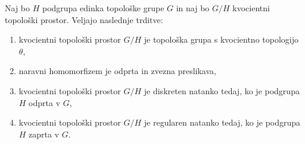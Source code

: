 \documentclass[mat1]{fmfdelo}
\begin{document}
\begin{izrek}\label{izr:kvocpovzetek}
Naj bo $H$ podgrupa edinka topološke grupe $G$ in naj bo $G/H$ kvocientni topološki prostor. Veljajo naslednje trditve:
\begin{enumerate}
\item kvocientni topološki prostor $G/H$ je topološka grupa s kvocientno topologijo $\theta$,\label{podtrd:kvoc1}
\item naravni homomorfizem je odprta in zvezna preslikava,\label{podtrd:kvoc2}
\item kvocientni topološki prostor $G/H$ je diskreten natanko tedaj, ko je podgrupa $H$ odprta v $G$,\label{podtrd:kvoc3}
\item kvocientni topološki prostor $G/H$ je regularen natanko tedaj, ko je pod\-gru\-pa $H$ zaprta v $G$.\label{podtrd:kvoc4}
\end{enumerate}
\end{izrek}
\end{document}
